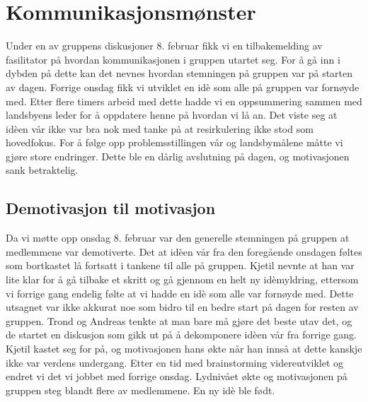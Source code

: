 \section{Kommunikasjonsmønster} %
Under en av gruppens diskusjoner 8. februar fikk vi en tilbakemelding av
fasilitator på hvordan kommunikasjonen i gruppen utartet seg. For å gå
inn i dybden på dette kan det nevnes hvordan stemningen på gruppen var
på starten av dagen. Forrige onsdag fikk vi utviklet en idè som alle på
gruppen var fornøyde med. Etter flere timers arbeid med dette hadde vi
en oppsummering sammen med landsbyens leder for å oppdatere henne på
hvordan vi lå an. Det viste seg at idèen vår ikke var bra nok med tanke
på at resirkulering ikke stod som hovedfokus. For å følge opp
problemsstillingen vår og landsbymålene måtte vi gjøre store endringer.
Dette ble en dårlig avslutning på dagen, og motivasjonen sank
betraktelig.
\subsection{Demotivasjon til motivasjon}
Da vi møtte opp onsdag 8. februar var den generelle stemningen på
gruppen at medlemmene var demotiverte. Det at idèen vår fra den
foregående onsdagen føltes som bortkastet lå fortsatt i tankene til alle
på gruppen. Kjetil nevnte at han var lite klar for å gå tilbake et
skritt og gå gjennom en helt ny idèmyldring, ettersom vi forrige gang
endelig følte at vi hadde en idè som alle var fornøyde med. Dette
utsagnet var ikke akkurat noe som bidro til en bedre start på dagen for
resten av gruppen. Trond og Andreas tenkte at man bare må gjøre det
beste utav det, og de startet en diskusjon som gikk ut på å dekomponere
idèen vår fra forrige gang. Kjetil kastet seg for på, og motivasjonen
hans økte når han innså at dette kanskje ikke var verdens undergang.
Etter en tid med brainstorming videreutviklet og endret vi det vi jobbet
med forrige onsdag. Lydnivået økte og motivasjonen på gruppen steg
blandt flere av medlemmene. En ny idè ble født.
